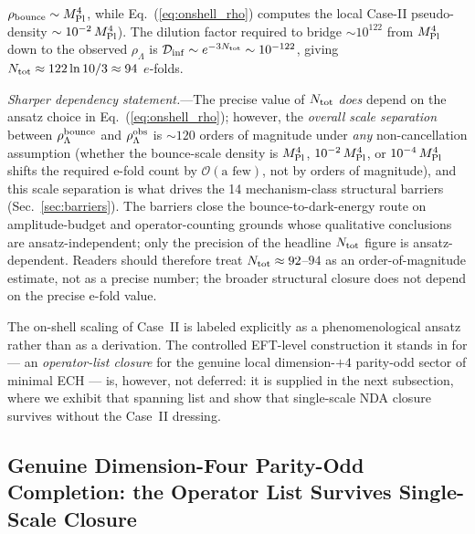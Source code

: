 \documentclass[aps,prd,twocolumn,superscriptaddress,showpacs,preprintnumbers,nofootinbib,longbibliography,floatfix]{revtex4-2}
\newcommand{\MPl}{M_{\rm Pl}}
\newcommand{\Dinf}{\mathcal{D}_{\rm inf}}
\begin{document}
$\rho_{\rm bounce}\sim\MPl^4$, while Eq.~(\ref{eq:onshell_rho}) computes
the local Case-II pseudo-density $\sim 10^{-2}\,\MPl^4$). The dilution factor required to bridge
$\sim 10^{122}$ from $\MPl^4$ down to the observed $\rho_\Lambda$ is
$\Dinf\sim e^{-3N_{\rm tot}}\sim 10^{-122}$, giving
$N_{\rm tot}\approx 122\ln 10/3 \approx 94$ $e$-folds.
\par
\textit{Sharper dependency statement.}---The precise value of
$N_{\rm tot}$ \emph{does}
depend on the ansatz choice in Eq.~(\ref{eq:onshell_rho}); however, the
\emph{overall scale separation} between $\rho_\Lambda^{\rm bounce}$ and
$\rho_\Lambda^{\rm obs}$ is ${\sim}120$ orders of magnitude under
\emph{any} non-cancellation assumption (whether the bounce-scale density
is $\MPl^4$, $10^{-2}\,\MPl^4$, or $10^{-4}\,\MPl^4$ shifts the required
e-fold count by $\mathcal{O}(\text{a few})$, not by orders of magnitude),
and this scale separation is what drives the 14 mechanism-class
structural barriers (Sec.~\ref{sec:barriers}). The barriers close the
bounce-to-dark-energy route on amplitude-budget and operator-counting
grounds whose qualitative conclusions are ansatz-independent; only the
precision of the headline $N_{\rm tot}$ figure is
ansatz-dependent. Readers should therefore treat
$N_{\rm tot} \approx 92$--$94$ as an order-of-magnitude estimate,
not as a precise number; the broader structural closure does not depend
on the precise e-fold value.
\par
The on-shell scaling of Case~II is labeled explicitly as a
phenomenological ansatz rather than as a derivation. The controlled
EFT-level construction it stands in for --- an \emph{operator-list
closure} for the genuine local dimension-$+4$ parity-odd sector of
minimal ECH --- is, however, not deferred: it is supplied in the next
subsection, where we exhibit that spanning list and show that single-scale
NDA closure survives without the Case~II dressing.

\subsection{Genuine Dimension-Four Parity-Odd Completion: the Operator
List Survives Single-Scale Closure}\label{app:dim4_completion}
\end{document}
